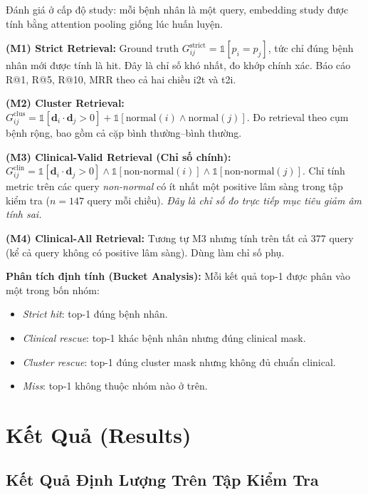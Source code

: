 \documentclass[12pt, a4paper]{article}
\newcommand{\vect}[1]{\mathbf{#1}}
\begin{document}
Đánh giá ở cấp độ study: mỗi bệnh nhân là một query, embedding study được
tính bằng attention pooling giống lúc huấn luyện.

\textbf{(M1) Strict Retrieval:}
Ground truth $G^\text{strict}_{ij} = \mathbb{1}[p_i = p_j]$, tức chỉ đúng
bệnh nhân mới được tính là hit. Đây là chỉ số khó nhất, đo khớp chính xác.
Báo cáo R@1, R@5, R@10, MRR theo cả hai chiều i2t và t2i.

\textbf{(M2) Cluster Retrieval:}
$G^\text{clus}_{ij} = \mathbb{1}[\vect{d}_i \cdot \vect{d}_j > 0]
+ \mathbb{1}[\text{normal}(i) \wedge \text{normal}(j)]$.
Đo retrieval theo cụm bệnh rộng, bao gồm cả cặp bình thường--bình thường.

\textbf{(M3) Clinical-Valid Retrieval (Chỉ số chính):}
$G^\text{clin}_{ij} = \mathbb{1}[\vect{d}_i \cdot \vect{d}_j > 0]
\wedge \mathbb{1}[\text{non-normal}(i)] \wedge \mathbb{1}[\text{non-normal}(j)]$.
Chỉ tính metric trên các query \textit{non-normal} có ít nhất một positive lâm
sàng trong tập kiểm tra ($n = 147$ query mỗi chiều).
\textit{Đây là chỉ số đo trực tiếp mục tiêu giảm âm tính sai.}

\textbf{(M4) Clinical-All Retrieval:} Tương tự M3 nhưng tính trên tất cả 377
query (kể cả query không có positive lâm sàng). Dùng làm chỉ số phụ.

\textbf{Phân tích định tính (Bucket Analysis):}
Mỗi kết quả top-1 được phân vào một trong bốn nhóm:
\begin{itemize}
  \item \textit{Strict hit}: top-1 đúng bệnh nhân.
  \item \textit{Clinical rescue}: top-1 khác bệnh nhân nhưng đúng clinical mask.
  \item \textit{Cluster rescue}: top-1 đúng cluster mask nhưng không đủ chuẩn clinical.
  \item \textit{Miss}: top-1 không thuộc nhóm nào ở trên.
\end{itemize}

\section{Kết Quả (Results)}
\label{sec:results}

\subsection{Kết Quả Định Lượng Trên Tập Kiểm Tra}
\end{document}
